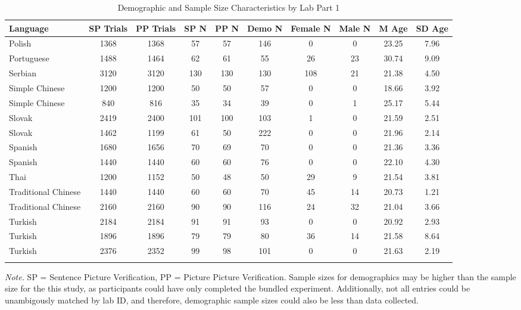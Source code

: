 \documentclass[
  man,floatsintext]{apa7}
\begin{document}
\begin{table}[tbp]

\begin{center}
\begin{threeparttable}

\caption{\label{tab:print-part3}Demographic and Sample Size Characteristics by Lab Part 1}

\footnotesize{

\begin{tabular}{lccccccccc}
\toprule
Language & SP 
Trials & PP 
Trials & SP 
N & PP 
N & Demo 
N & Female 
N & Male 
N & M 
Age & SD 
Age\\
\midrule
Polish & 1368 & 1368 & 57 & 57 & 146 & 0 & 0 & 23.25 & 7.96\\
Portuguese & 1488 & 1464 & 62 & 61 & 55 & 26 & 23 & 30.74 & 9.09\\
Serbian & 3120 & 3120 & 130 & 130 & 130 & 108 & 21 & 21.38 & 4.50\\
Simple Chinese & 1200 & 1200 & 50 & 50 & 57 & 0 & 0 & 18.66 & 3.92\\
Simple Chinese & 840 & 816 & 35 & 34 & 39 & 0 & 1 & 25.17 & 5.44\\
Slovak & 2419 & 2400 & 101 & 100 & 103 & 1 & 0 & 21.59 & 2.51\\
Slovak & 1462 & 1199 & 61 & 50 & 222 & 0 & 0 & 21.96 & 2.14\\
Spanish & 1680 & 1656 & 70 & 69 & 70 & 0 & 0 & 21.36 & 3.36\\
Spanish & 1440 & 1440 & 60 & 60 & 76 & 0 & 0 & 22.10 & 4.30\\
Thai & 1200 & 1152 & 50 & 48 & 50 & 29 & 9 & 21.54 & 3.81\\
Traditional Chinese & 1440 & 1440 & 60 & 60 & 70 & 45 & 14 & 20.73 & 1.21\\
Traditional Chinese & 2160 & 2160 & 90 & 90 & 116 & 24 & 32 & 21.04 & 3.66\\
Turkish & 2184 & 2184 & 91 & 91 & 93 & 0 & 0 & 20.92 & 2.93\\
Turkish & 1896 & 1896 & 79 & 79 & 80 & 36 & 14 & 21.58 & 8.64\\
Turkish & 2376 & 2352 & 99 & 98 & 101 & 0 & 0 & 21.63 & 2.19\\
\bottomrule
\addlinespace
\end{tabular}

}

\begin{tablenotes}[para]
\normalsize{\textit{Note.} SP = Sentence Picture Verification, PP = Picture Picture Verification. Sample sizes for demographics may be higher than the sample size for the this study, as participants could have only completed the bundled experiment. Additionally, not all entries could be unambigously matched by lab ID, and therefore, demographic sample sizes could also be less than data collected.}
\end{tablenotes}

\end{threeparttable}
\end{center}

\end{table}
\end{document}
